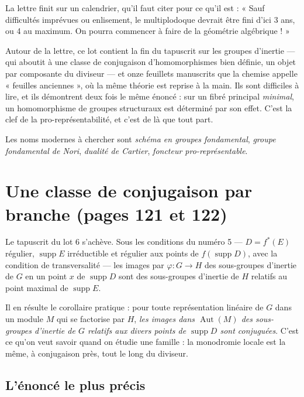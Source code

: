 \documentclass[11pt,a4paper]{article}
\begin{document}
\begin{resume}
La lettre finit sur un calendrier, qu'il faut citer pour ce qu'il est : « Sauf
difficultés imprévues ou enlisement, le multiplodoque devrait être fini d'ici
3 ans, ou 4 au maximum. On pourra commencer à faire de la géométrie
algébrique ! »

Autour de la lettre, ce lot contient la fin du tapuscrit sur les groupes
d'inertie --- qui aboutit à une classe de conjugaison d'homomorphismes bien
définie, un objet par composante du diviseur --- et onze feuillets manuscrits
que la chemise appelle « feuilles anciennes », où la même théorie est reprise à
la main. Ils sont difficiles à lire, et ils démontrent deux fois le même
énoncé : sur un fibré principal \emph{minimal}, un homomorphisme de groupes
structuraux est déterminé par son effet. C'est la clef de la
pro-représentabilité, et c'est de là que tout part.

Les noms modernes à chercher sont \emph{schéma en groupes fondamental},
\emph{groupe fondamental de Nori}, \emph{dualité de Cartier}, \emph{foncteur
pro-représentable}.

\end{resume}

\section*{Une classe de conjugaison par branche (pages 121 et 122)}

Le tapuscrit du lot 6 s'achève. Sous les conditions du numéro 5 --- $D =
f^{*}(E)$ régulier, $\operatorname{supp} E$ irréductible et régulier aux points
de $f(\operatorname{supp} D)$, avec la condition de transversalité --- les
images par $\varphi : G \to H$ des sous-groupes d'inertie de $G$ en un point
$x$ de $\operatorname{supp} D$ sont des sous-groupes d'inertie de $H$ relatifs
au point maximal de $\operatorname{supp} E$.

Il en résulte le corollaire pratique : pour toute représentation linéaire de
$G$ dans un module $M$ qui se factorise par $H$, \emph{les images dans
$\operatorname{Aut}(M)$ des sous-groupes d'inertie de $G$ relatifs aux divers
points de $\operatorname{supp} D$ sont conjuguées}. C'est ce qu'on veut savoir
quand on étudie une famille : la monodromie locale est la même, à conjugaison
près, tout le long du diviseur.

\subsection*{L'énoncé le plus précis}
\end{document}
